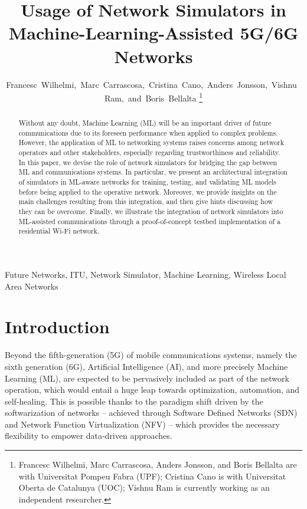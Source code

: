 \documentclass[journal]{IEEEtran}
\begin{document}
	\title{Usage of Network Simulators in \\Machine-Learning-Assisted 5G/6G Networks}
	
	\author{Francesc~Wilhelmi,~Marc~Carrascosa,~Cristina~Cano,~Anders~Jonsson,~Vishnu~Ram,~and~Boris~Bellalta%
		\thanks{Francesc Wilhelmi, Marc Carrascosa, Anders Jonsson, and Boris Bellalta are with Universitat Pompeu Fabra (UPF); Cristina Cano is with Universitat Oberta de Catalunya (UOC); Vishnu Ram is currently working as an independent researcher.}%
	}
	
	\maketitle
	
	\begin{abstract}
		Without any doubt, Machine Learning (ML) will be an important driver of future communications due to its foreseen performance when applied to complex problems. However, the application of ML to networking systems raises concerns among network operators and other stakeholders, especially regarding trustworthiness and reliability. In this paper, we devise the role of network simulators for bridging the gap between ML and communications systems. In particular, we present an architectural integration of simulators in ML-aware networks for training, testing, and validating ML models before being applied to the operative network. Moreover, we provide insights on the main challenges resulting from this integration, and then give hints discussing how they can be overcome. Finally, we illustrate the integration of network simulators into ML-assisted communications through a proof-of-concept testbed implementation of a residential Wi-Fi network. 
	\end{abstract}
	
	\begin{IEEEkeywords}
		Future Networks, ITU, Network Simulator, Machine Learning, Wireless Local Area Networks
	\end{IEEEkeywords}
	
	\IEEEpeerreviewmaketitle
	
	\section{Introduction}
	
	Beyond the fifth-generation (5G) of mobile communications systems, namely the sixth generation (6G), Artificial Intelligence (AI), and more precisely Machine Learning (ML), are expected to be pervasively included as part of the network operation, which would entail a huge leap towards optimization, automation, and self-healing. This is possible thanks to the paradigm shift driven by the softwarization of networks -- achieved through Software Defined Networks (SDN) and Network Function Virtualization (NFV) -- which provides the necessary flexibility to empower data-driven approaches.
	
\end{document}
